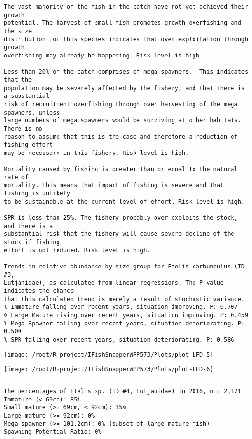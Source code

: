 \documentclass{report}\usepackage[]{graphicx}\usepackage[]{color}
\makeatletter
\def\maxwidth{ %
  \ifdim\Gin@nat@width>\linewidth
    \linewidth
  \else
    \Gin@nat@width
  \fi
}
\newenvironment{kframe}{%
 \def\at@end@of@kframe{}%
 \ifinner\ifhmode%
  \def\at@end@of@kframe{\end{minipage}}%
  \begin{minipage}{\columnwidth}%
 \fi\fi%
 \def\FrameCommand##1{\hskip\@totalleftmargin \hskip-\fboxsep
 \colorbox{shadecolor}{##1}\hskip-\fboxsep
     \hskip-\linewidth \hskip-\@totalleftmargin \hskip\columnwidth}%
 \MakeFramed {\advance\hsize-\width
   \@totalleftmargin\z@ \linewidth\hsize
   \@setminipage}}%
 {\par\unskip\endMakeFramed%
 \at@end@of@kframe}
\newenvironment{knitrout}{}{} %
\makeatother
\begin{document}
\begin{knitrout}
\begin{kframe}
\begin{verbatim}
The vast majority of the fish in the catch have not yet achieved their growth
potential. The harvest of small fish promotes growth overfishing and the size
distribution for this species indicates that over exploitation through growth
overfishing may already be happening. Risk level is high.

Less than 20% of the catch comprises of mega spawners.  This indicates that the
population may be severely affected by the fishery, and that there is a substantial
risk of recruitment overfishing through over harvesting of the mega spawners, unless
large numbers of mega spawners would be surviving at other habitats. There is no
reason to assume that this is the case and therefore a reduction of fishing effort
may be necessary in this fishery. Risk level is high.
 
Mortality caused by fishing is greater than or equal to the natural rate of
mortality. This means that impact of fishing is severe and that fishing is unlikely
to be sustainable at the current level of effort. Risk level is high.
 
SPR is less than 25%. The fishery probably over-exploits the stock, and there is a
substantial risk that the fishery will cause severe decline of the stock if fishing
effort is not reduced. Risk level is high.
 
Trends in relative abundance by size group for Etelis carbunculus (ID #3,
Lutjanidae), as calculated from linear regressions. The P value indicates the chance
that this calculated trend is merely a result of stochastic variance.
% Immature falling over recent years, situation improving. P: 0.707
% Large Mature rising over recent years, situation improving. P: 0.459
% Mega Spawner falling over recent years, situation deteriorating. P: 0.500
% SPR falling over recent years, situation deteriorating. P: 0.586
\end{verbatim}
\end{kframe}
\texttt{[image: /root/R-project/IFishSnapperWPP573/Plots/plot-LFD-5]} 

\texttt{[image: /root/R-project/IFishSnapperWPP573/Plots/plot-LFD-6]} 
\begin{kframe}\begin{verbatim}
\end{verbatim}
\end{kframe}
\clearpage
\newpage
\begin{kframe}\begin{verbatim}The percentages of Etelis sp. (ID #4, Lutjanidae) in 2016, n = 2,171
Immature (< 69cm): 85%
Small mature (>= 69cm, < 92cm): 15%
Large mature (>= 92cm): 0%
Mega spawner (>= 101.2cm): 0% (subset of large mature fish)
Spawning Potential Ratio: 0%
 

\end{verbatim}
\end{kframe}
\end{knitrout}
\end{document}

